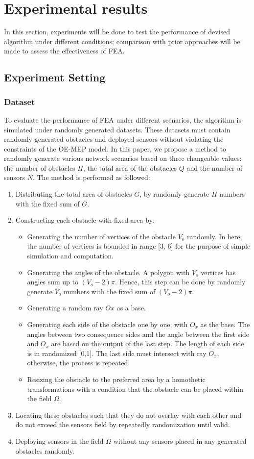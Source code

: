 \documentclass[final]{elsarticle}
\begin{document}
\section{Experimental results}
In this section, experiments will be done to test the performance of devised algorithm under different conditions; comparison with prior approaches will be made to assess the effectiveness of FEA. 
\subsection{Experiment Setting}
\subsubsection{Dataset}
To evaluate the performance of FEA under different scenarios, the algorithm is simulated under randomly generated datasets. These datasets must contain randomly generated obstacles and deployed sensors without violating the constraints of the OE-MEP model. In this paper, we propose a method to randomly generate various network scenarios based on three changeable values: the number of obstacles $H$, the total area of the obstacles $Q$ and the number of sensors $N$. The method is performed as followed: 

\begin{enumerate}
	\item Distributing the total area of obstacles $G$, by randomly generate $H$ numbers with the fixed sum of $G$.
	\item Constructing each obstacle with fixed area by:
	\begin{itemize}
		\item Generating the number of vertices of the obstacle $V_o$ randomly. In here, the number of vertices is bounded in range [3, 6] for the purpose of simple simulation and computation. 
		\item Generating the angles of the obstacle. A polygon with $V_o$ vertices has angles sum up to $(V_o - 2)\pi$. Hence, this step can be done by randomly generate $V_o$ numbers with the fixed sum of $(V_o - 2)\pi$.
		\item Generating a random ray $Ox$ as a base.
		\item Generating each side of the obstacle one by one, with $O_x$ as the base. The angles between two consequence sides and the angle between the first side and $O_x$ are based on the output of the last step. The length of each side is in randomized [0,1]. The last side must intersect with ray $O_x$, otherwise, the process is repeated.
		\item Resizing the obstacle to the preferred area by a homothetic transformations with a condition that the obstacle can be placed within the field $\Omega$.
	\end{itemize}
	\item Locating these obstacles such that they do not overlay with each other and do not exceed the sensors field by repeatedly randomization until valid.
	\item Deploying sensors in the field $\Omega$ without any sensors placed in any generated obstacles randomly.
\end{enumerate}
\end{document}
